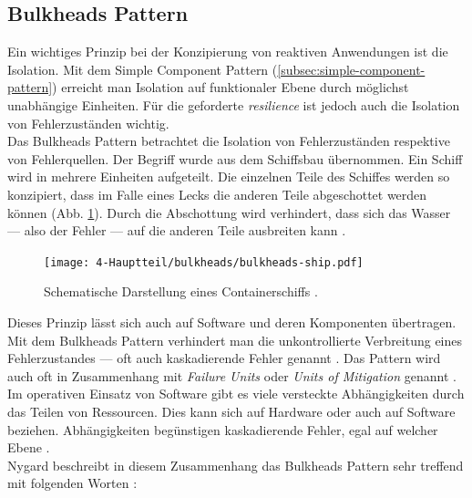\subsection{Bulkheads Pattern}\label{subsec:bulkheads-pattern}
Ein wichtiges Prinzip bei der Konzipierung von reaktiven Anwendungen ist die Isolation. Mit dem Simple Component Pattern (\ref{subsec:simple-component-pattern}) erreicht man Isolation auf funktionaler Ebene durch möglichst unabhängige Einheiten. Für die geforderte \textit{resilience} ist jedoch auch die Isolation von Fehlerzuständen wichtig.\\
Das Bulkheads Pattern betrachtet die Isolation von Fehlerzuständen respektive von Fehlerquellen. Der Begriff wurde aus dem Schiffsbau übernommen. Ein Schiff wird in mehrere Einheiten aufgeteilt. Die einzelnen Teile des Schiffes werden so konzipiert, dass im Falle eines Lecks die anderen Teile abgeschottet werden können (Abb. \ref{fig:bulkheads-ship}). Durch die Abschottung wird verhindert, dass sich das Wasser --- also der Fehler --- auf die anderen Teile ausbreiten kann \cite[S.~95]{nygard_release_2007} \cite[S.~214]{newman_building_2015} \cite[S.~35]{kuhn_reactive_2015}.\\

\begin{figure}[H]
 \centering
 \texttt{[image: 4-Hauptteil/bulkheads/bulkheads-ship.pdf]}
 \caption{Schematische Darstellung eines Containerschiffs \cite[S.~35]{kuhn_reactive_2015}.}
 \label{fig:bulkheads-ship}
\end{figure}

Dieses Prinzip lässt sich auch auf Software und deren Komponenten übertragen. Mit dem Bulkheads Pattern verhindert man die unkontrollierte Verbreitung eines Fehlerzustandes --- oft auch kaskadierende Fehler genannt \cite{friedrichsen_unkaputtbar_2014}. Das Pattern wird auch oft in Zusammenhang mit \textit{Failure Units} oder \textit{Units of Mitigation} genannt \cite{friedrichsen_unkaputtbar_2014}.\\
Im operativen Einsatz von Software gibt es viele versteckte Abhängigkeiten durch das Teilen von Ressourcen. Dies kann sich auf Hardware oder auch auf Software beziehen. Abhängigkeiten begünstigen kaskadierende Fehler, egal auf welcher Ebene \cite[S.~96]{nygard_release_2007} \cite{friedrichsen_unkaputtbar_2014}.\\

Nygard beschreibt in diesem Zusammenhang das Bulkheads Pattern sehr treffend mit folgenden Worten \cite[S.~96]{nygard_release_2007}:

